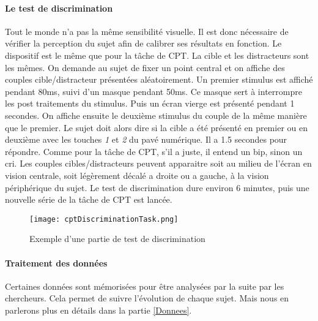 \paragraph{Le test de discrimination}Tout le monde n'a pas la même sensibilité visuelle. Il est donc nécessaire de vérifier la perception du sujet afin de calibrer ses résultats en
fonction. Le dispositif est le même que pour la tâche de CPT. La cible et les distracteurs sont les mêmes. On demande au sujet de fixer un point central et on affiche des couples
cible/distracteur présentées aléatoirement. Un premier stimulus est affiché pendant 80ms, suivi d'un masque pendant 50ms. Ce masque sert à interrompre les post traitements du
stimulus. Puis un écran vierge est présenté pendant 1 secondes. On affiche ensuite le deuxième stimulus du couple de la même manière que le premier. Le sujet doit alors dire si la
cible a été présenté en premier ou en deuxième avec les touches \emph{1} et \emph{2} du pavé numérique. Il a 1.5 secondes pour répondre. Comme pour la tâche de CPT, s'il a juste, il
entend un bip, sinon un cri. Les couples cibles/distracteurs peuvent apparaitre soit au milieu de l'écran en vision centrale, soit légèrement décalé a droite ou a gauche, à la vision
périphérique du sujet. Le test de discrimination dure environ 6 minutes, puis une nouvelle série de la tâche de CPT est lancée.

\begin{figure}[H]
    \begin{center}
    \texttt{[image: cptDiscriminationTask.png]}
    \end{center}
    \caption{Exemple d'une partie de test de discrimination}
\label{CptDiscriminationTask}
\end{figure}

\paragraph{Traitement des données}Certaines données sont mémorisées pour être analysées par la suite par les chercheurs. Cela permet de suivre l'évolution de chaque sujet. Mais nous
en parlerons plus en détails dans la partie \ref{Donnees}.
